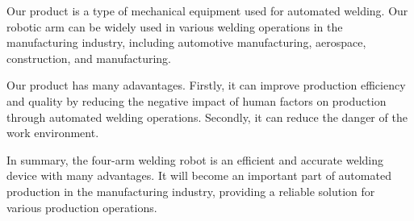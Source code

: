 Our product is a type of mechanical equipment used for automated welding. Our robotic arm can be widely used in various welding operations in the manufacturing industry, including automotive manufacturing, aerospace, construction, and manufacturing.

Our product has many adavantages. Firstly, it can improve production efficiency and quality by reducing the negative impact of human factors on production through automated welding operations. Secondly, it can reduce the danger of the work environment. 

In summary, the four-arm welding robot is an efficient and accurate welding device with many advantages. It will become an important part of automated production in the manufacturing industry, providing a reliable solution for various production operations.

